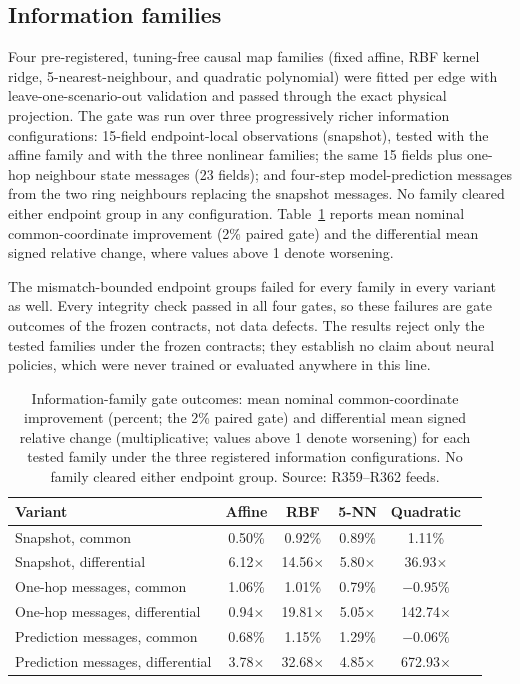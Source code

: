 \documentclass[journal]{IEEEtran}
\begin{document}
\subsection{Information families}
\label{sec:families}

Four pre-registered, tuning-free causal map families (fixed affine, RBF kernel ridge, 5-nearest-neighbour, and quadratic polynomial) were fitted per edge with leave-one-scenario-out validation and passed through the exact physical projection. The gate was run over three progressively richer information configurations: 15-field endpoint-local observations (snapshot), tested with the affine family and with the three nonlinear families; the same 15 fields plus one-hop neighbour state messages (23 fields); and four-step model-prediction messages from the two ring neighbours replacing the snapshot messages. No family cleared either endpoint group in any configuration. Table~\ref{tab:family} reports mean nominal common-coordinate improvement (2\% paired gate) and the differential mean signed relative change, where values above 1 denote worsening.

The mismatch-bounded endpoint groups failed for every family in every variant as well. Every integrity check passed in all four gates, so these failures are gate outcomes of the frozen contracts, not data defects. The results reject only the tested families under the frozen contracts; they establish no claim about neural policies, which were never trained or evaluated anywhere in this line.

\begin{table}[!t]
\centering
\caption{Information-family gate outcomes: mean nominal common-coordinate improvement (percent; the 2\% paired gate) and differential mean signed relative change (multiplicative; values above 1 denote worsening) for each tested family under the three registered information configurations. No family cleared either endpoint group. Source: R359--R362 feeds.}
\label{tab:family}
\begin{tabular}{lccccc}
\toprule
Variant & Affine & RBF & 5-NN & Quadratic\\
\midrule
Snapshot, common & 0.50\% & 0.92\% & 0.89\% & 1.11\%\\
Snapshot, differential & 6.12$\times$ & 14.56$\times$ & 5.80$\times$ & 36.93$\times$\\
One-hop messages, common & 1.06\% & 1.01\% & 0.79\% & $-0.95\%$\\
One-hop messages, differential & 0.94$\times$ & 19.81$\times$ & 5.05$\times$ & 142.74$\times$\\
Prediction messages, common & 0.68\% & 1.15\% & 1.29\% & $-0.06\%$\\
Prediction messages, differential & 3.78$\times$ & 32.68$\times$ & 4.85$\times$ & 672.93$\times$\\
\bottomrule
\end{tabular}
\end{table}
\end{document}

